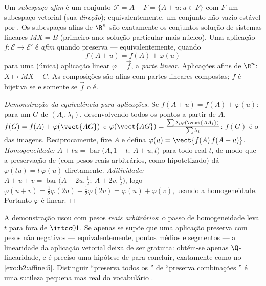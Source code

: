 \begin{definition}\label{def:b2:affine:subspace}
Um \emph{subespaço afim} é um conjunto $\mathcal{F} = A + F = \{A + u :
u \in F\}$ com $F$ um subespaço vetorial (sua \emph{direção});
equivalentemente, um conjunto não vazio estável por . Os subespaços
afins de $\R^n$ são exatamente os conjuntos solução de sistemas lineares
$MX = B$ (primeiro ano: solução particular mais núcleo). Uma aplicação $f \colon
\mathcal{E} \to \mathcal{E}'$ é \emph{afim}
quando preserva  --- equivalentemente, quando
\[
f(A + u) = f(A) + \varphi(u)
\]
para uma (única) aplicação linear $\varphi = \vec f$, a \emph{parte
linear}. Aplicações afins de $\R^n$: $X \mapsto MX + C$. As composições são
afins com partes lineares compostas; $f$ é bijetiva se e somente se $\vec f$
o é.
\end{definition}

\begin{proof}[Demonstração da equivalência para aplicações]
Se $f(A + u) = f(A) + \varphi(u)$: para um  $G$ de $(A_i,
\lambda_i)$, desenvolvendo todos os pontos a partir de $A$, $f(G) = f(A) +
\varphi(\vect{AG})$ e $\varphi(\vect{AG}) =
\frac{\sum\lambda_i\varphi(\vect{AA_i})}{\sum\lambda_i}$: $f(G)$ é
o  das imagens. Reciprocamente, fixe $A$ e defina
$\varphi(u) = \vect{f(A)\,f(A + u)}$. \emph{Homogeneidade:} $A + tu =
\operatorname{bar}\bigl(A, 1-t;\ A + u, t\bigr)$ para todo real
$t$, de modo que a preservação de  (com pesos reais arbitrários,
como hipotetizado) dá $\varphi(tu) = t\,\varphi(u)$ diretamente.
\emph{Aditividade:} $A + u + v = \operatorname{bar}\bigl(A + 2u,
\tfrac12;\ A + 2v, \tfrac12\bigr)$, logo $\varphi(u + v) =
\tfrac12\varphi(2u) + \tfrac12\varphi(2v) = \varphi(u) +
\varphi(v)$, usando a homogeneidade. Portanto $\varphi$ é linear.
\end{proof}

\begin{remark}
A demonstração usou  com pesos \emph{reais arbitrários}:
o passo de homogeneidade leva $t$ para fora de $\intcc01$.
Se apenas se supõe que uma aplicação preserva  com
pesos não negativos --- equivalentemente, pontos médios e segmentos
--- a linearidade da aplicação vetorial deixa de ser gratuita:
obtém-se apenas $\Q$-linearidade, e é preciso uma hipótese de 
para concluir, exatamente como no
\cref{exo:b2:affine:5}. Distinguir ``preserva todos os
'' de ``preserva combinações '' é uma
sutileza pequena mas real do vocabulário .
\end{remark}

